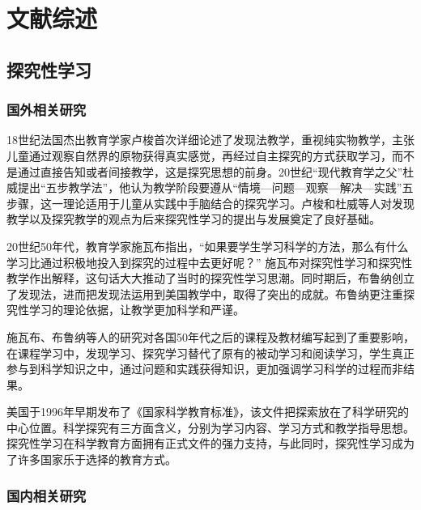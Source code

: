 \chapter{文献综述}


\section{探究性学习}


\subsection{国外相关研究}

18世纪法国杰出教育学家卢梭首次详细论述了发现法教学，重视纯实物教学，主张儿童通过观察自然界的原物获得真实感觉，再经过自主探究的方式获取学习，而不是通过直接告知或者间接教学，这是探究思想的前身。20世纪“现代教育学之父”杜威提出“五步教学法”，他认为教学阶段要遵从“情境—问题—观察—解决—实践”五步骤，这一理论适用于儿童从实践中手脑结合的探究学习。卢梭和杜威等人对发现教学以及探究教学的观点为后来探究性学习的提出与发展奠定了良好基础。

20世纪50年代，教育学家施瓦布指出，“如果要学生学习科学的方法，那么有什么学习比通过积极地投入到探究的过程中去更好呢？” 施瓦布对探究性学习和探究性教学作出解释，这句话大大推动了当时的探究性学习思潮。同时期后，布鲁纳创立了发现法，进而把发现法运用到美国教学中，取得了突出的成就。布鲁纳更注重探究性学习的理论依据，让教学更加科学和严谨。

施瓦布、布鲁纳等人的研究对各国50年代之后的课程及教材编写起到了重要影响，在课程学习中，发现学习、探究学习替代了原有的被动学习和阅读学习，学生真正参与到科学知识之中，通过问题和实践获得知识，更加强调学习科学的过程而非结果。

美国于1996年早期发布了《国家科学教育标准》，该文件把探索放在了科学研究的中心位置。科学探究有三方面含义，分别为学习内容、学习方式和教学指导思想\cite{科学探究与国家科学教育标准}。探究性学习在科学教育方面拥有正式文件的强力支持，与此同时，探究性学习成为了许多国家乐于选择的教育方式。


\subsection{国内相关研究}

